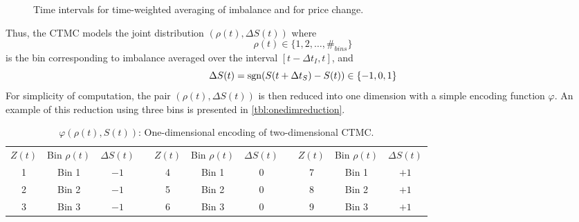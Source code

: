 \begin{figure}[H]
  \centering
  
\caption{Time intervals for time-weighted averaging of imbalance and for price change.}
\label{fig:timewindows}
\end{figure}

Thus, the CTMC models the joint distribution $(\rho(t), \Delta S(t))$ where 
\[ \rho(t) \in \lbrace 1,2,\dots,\#_{bins} \rbrace \]
is the bin corresponding to imbalance averaged over the interval $[t-\Delta t_I, t]$, and
\[ \Delta S(t) = \operatorname{\mathrm{sgn}}(S(t+\Delta t_S)-S(t)) \in \lbrace -1, 0, 1 \rbrace \]
For simplicity of computation, the pair $(\rho(t), \Delta S(t))$ is then reduced into one dimension with a simple encoding function $\varphi$. An example of this reduction using three bins is presented in \autoref{tbl:onedimreduction}.
\begin{table}[H]%
\centering%
%
\caption[One-dimensional encoding of two-dimensional CTMC]{$\varphi(\rho(t),S(t))$: One-dimensional encoding of two-dimensional CTMC.}\label{tbl:onedimreduction}%
\begin{tabular}{@{} *{11}{c} @{}}%
\toprule
$Z(t)$ & Bin $\rho(t)$ & $\Delta S(t)$ & \phantom{abc} & $Z(t)$ & Bin $\rho(t)$ & $\Delta S(t)$ & \phantom{abc} & $Z(t)$ & Bin $\rho(t)$ & $\Delta S(t)$ \\
\cmidrule{1-3} \cmidrule{5-7} \cmidrule{9-11}
1 & Bin 1 & $-1$ && 4 & Bin 1 & $0$ && 7 & Bin 1 & $+1$ \\
2 & Bin 2 & $-1$ && 5 & Bin 2 & $0$ && 8 & Bin 2 & $+1$ \\
3 & Bin 3 & $-1$ && 6 & Bin 3 & $0$ && 9 & Bin 3 & $+1$ \\
\bottomrule%
\end{tabular}%
\end{table}%

